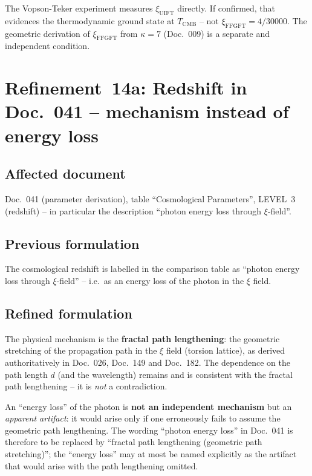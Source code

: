 The Vopson-Teker experiment measures $\xi_\text{UIFT}$ directly. If confirmed,
that evidences the thermodynamic ground state at $T_\text{CMB}$ -- not
$\xi_\text{FFGFT} = 4/30000$. The geometric derivation of $\xi_\text{FFGFT}$
from $\kappa = 7$ (Doc.~009) is a separate and independent condition.

\section{\texorpdfstring{Refinement~14a: Redshift in Doc.~041 -- mechanism instead of energy loss}{Refinement 14a: Redshift in Doc. 041 -- mechanism instead of energy loss}}

\subsection*{Affected document}

Doc.~041 (parameter derivation), table \enquote{Cosmological Parameters},
LEVEL~3 (redshift) -- in particular the description
\enquote{photon energy loss through $\xi$-field}.

\subsection*{Previous formulation}

The cosmological redshift is labelled in the comparison table as
\enquote{photon energy loss through $\xi$-field} -- i.e.\ as an energy loss of
the photon in the $\xi$ field.

\subsection*{Refined formulation}

The physical mechanism is the \textbf{fractal path lengthening}: the geometric
stretching of the propagation path in the $\xi$ field (torsion lattice), as
derived authoritatively in Doc.~026, Doc.~149 and Doc.~182. The dependence on
the path length $d$ (and the wavelength) remains and is consistent with the
fractal path lengthening -- it is \emph{not} a contradiction.

An \enquote{energy loss} of the photon is \textbf{not an independent
mechanism} but an \emph{apparent artifact}: it would arise only if one
erroneously fails to assume the geometric path lengthening. The wording
\enquote{photon energy loss} in Doc.~041 is therefore to be replaced by
\enquote{fractal path lengthening (geometric path stretching)}; the
\enquote{energy loss} may at most be named explicitly as the artifact that
would arise with the path lengthening omitted.

